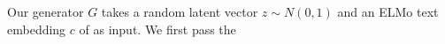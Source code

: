 Our generator $G$ takes a random latent vector $z \sim N(0, 1)$ and an ELMo text embedding $c$ of as input. We first pass the 